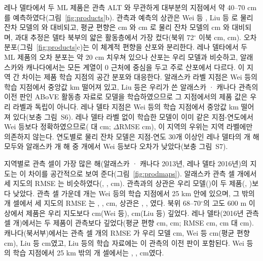 레나 델타에서 두 ML 제품은 관측 ALT 와 무관하게 대부분의 지점에서 약 40--70 cm 를 예측하였다(그림~\ref{fig:products}b). 관측과 예측의 상관은 Wei 등 \nrLeWei, Liu 등 \nrLeLiu{} 로 물리 잔차 모델의 \nrLeRo{} 와 대비되고, 평균 편향은 \nbiasLeAllWei{} cm 와 \nbiasLeAllLiu{} cm 로 물리 잔차 모델의 \nbiasLeAllRo{} cm 와 대비되며, 과대 추정은 델타 북부의 얇은 활동층에서 가장 컸다(북위 72$^\circ$ 이북 \nbiasLeNorthWei{} cm, \nbiasLeNorthLiu{} cm). 오차 분포(그림~\ref{fig:products}c)는 이 체계적 편향을 산포와 분리한다. 레나 델타에서 두 ML 제품의 오차 분포는 약 20 cm 치우쳐 있으나 산포는 우리 모델과 비슷하고, 알래스카와 캐나다에서는 모든 계열이 0 근처에 중심을 두고 주로 산포에서 다르다. 이 지역 간 차이는 제품 학습 지점의 공간 분포와 대응한다. 알래스카 라벨 지점은 Wei 등의 학습 지점에서 중앙값 \ndistweiAkmed{} km 떨어져 있고, Liu 등은 우리가 쓴 알래스카 · 캐나다 관측의 이전 판인 ABoVE 활동층 자료로 모델을 학습하였으므로 그 지점에서의 제품 값은 우리 라벨과 독립이 아니다. 레나 델타 지점은 Wei 등의 학습 지점에서 중앙값 \ndistweiLemed{} km 떨어져 있다(보충 그림~S6). 레나 델타 라벨 없이 학습한 모델이 이미 같은 지점-연도에서 Wei 등보다 정확하였으므로(\ntlvprmseLeRsWeizero{} 대 \ntlvprmseLeWeizero{} cm; $\Delta$RMSE \ntlvpLeRsWeizero{} cm), 이 지역의 우위는 지역 라벨에만 의존하지 않는다. 연도별로 물리 잔차 모델은 지점-연도 30개 이상인 레나 델타의 \nywLen{}개 해 모두와 알래스카 \nywAkRoWein{}개 해 중 \nywAkRoWeiwin{}개에서 Wei 등보다 오차가 낮았다(보충 그림~S7).


지역별로 관측 셀이 가장 많은 해(알래스카 · 캐나다 2013년, 레나 델타 2016년)의 지도는 이 차이를 공간적으로 보여 준다(그림~\ref{fig:prodmaps}). 알래스카 관측 셀 \nfeAkN{}개에서 세 지도의 RMSE 는 비슷하였다(\nfeAkOof, \nfeAkWei, \nfeAkLiu{} cm). 관측과의 상관은 우리 모델(\nfeAkROof)이 두 제품(\nfeAkRWei, \nfeAkRLiu)보다 낮았다. 관측 셀 가운데 \nfeAkNNear{}개는 Wei 등의 학습 지점에서 25 km 안에 있으며, 그 밖의 \nfeAkNFar{}개 셀에서 세 지도의 RMSE 는 \nfeAkFarOof, \nfeAkFarWei, \nfeAkFarLiu{} cm, 상관은 \nfeAkFarROof, \nfeAkFarRWei, \nfeAkFarRLiu 였다. 북위 68--70$^\circ$의 고도 600 m 이상에서 제품은 우리 지도보다 \nmapAkFootMtnWei{} cm(Wei 등), \nmapAkFootMtnLiu{} cm(Liu 등) 깊었다. 레나 델타(2016년 관측 셀 \nfeLeN{}개)에서는 두 제품이 관측보다 깊었다(평균 편향 \nfeLeBiasWei{} cm, \nfeLeBiasLiu{} cm; RMSE \nfeLeWei{} cm, \nfeLeLiu{} cm 대 \nfeLeOof{} cm). 캐나다(북서부)에서는 관측 셀 \nfeCaN{}개의 RMSE 가 우리 모델 \nfeCaOof{} cm, Wei 등 \nfeCaWei{} cm(평균 편향 \nfeCaBiasWei{} cm), Liu 등 \nfeCaLiu{} cm였고, Liu 등의 학습 자료에는 이 관측의 이전 판이 포함된다. Wei 등의 학습 지점에서 25 km 밖의 \nfeCaNFar{}개 셀에서는 \nfeCaFarOof, \nfeCaFarWei, \nfeCaFarLiu{} cm였다.

